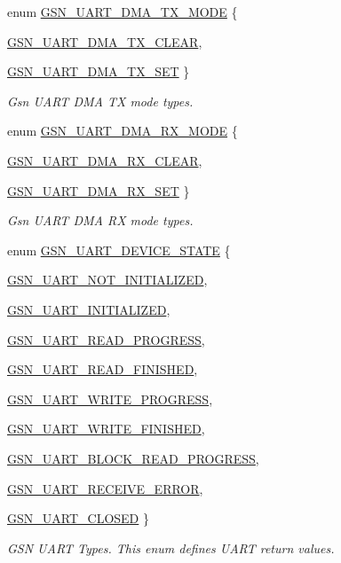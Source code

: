 \begin{DoxyCompactItemize}
enum \hyperlink{a00656_ga09347558a3ca84081b700f762369ff09}{GSN\_\-UART\_\-DMA\_\-TX\_\-MODE} \{ \par
\hyperlink{a00656_gga09347558a3ca84081b700f762369ff09ab713fb7412083d9608b9c7dcb47705f9}{GSN\_\-UART\_\-DMA\_\-TX\_\-CLEAR}, 
\par
\hyperlink{a00656_gga09347558a3ca84081b700f762369ff09a678a20a0d6e4f1a555e07f1291188153}{GSN\_\-UART\_\-DMA\_\-TX\_\-SET}
 \}
\begin{DoxyCompactList}\small\item\em Gsn UART DMA TX mode types. \end{DoxyCompactList}\item 
enum \hyperlink{a00656_gaef21b1191deb90943f343ad04ef5339b}{GSN\_\-UART\_\-DMA\_\-RX\_\-MODE} \{ \par
\hyperlink{a00656_ggaef21b1191deb90943f343ad04ef5339ba5440e9f8ca11a0d1fcd66fcbdac4a01d}{GSN\_\-UART\_\-DMA\_\-RX\_\-CLEAR}, 
\par
\hyperlink{a00656_ggaef21b1191deb90943f343ad04ef5339bad7cfcc300aded98ca2db71d3276cb442}{GSN\_\-UART\_\-DMA\_\-RX\_\-SET}
 \}
\begin{DoxyCompactList}\small\item\em Gsn UART DMA RX mode types. \end{DoxyCompactList}\item 
enum \hyperlink{a00656_ga42c5ecdf0c08902681813944c3b6afdc}{GSN\_\-UART\_\-DEVICE\_\-STATE} \{ \par
\hyperlink{a00656_gga42c5ecdf0c08902681813944c3b6afdca86763e1e0e68eff7d0d7daa2371bd4d8}{GSN\_\-UART\_\-NOT\_\-INITIALIZED}, 
\par
\hyperlink{a00656_gga42c5ecdf0c08902681813944c3b6afdca9e3fa475abd418f2edffe86d5528f4f1}{GSN\_\-UART\_\-INITIALIZED}, 
\par
\hyperlink{a00656_gga42c5ecdf0c08902681813944c3b6afdca090949a6a7da5bbd9bbb3b112715a3fa}{GSN\_\-UART\_\-READ\_\-PROGRESS}, 
\par
\hyperlink{a00656_gga42c5ecdf0c08902681813944c3b6afdca474ad9ad38710696ebc404a470bd992e}{GSN\_\-UART\_\-READ\_\-FINISHED}, 
\par
\hyperlink{a00656_gga42c5ecdf0c08902681813944c3b6afdcaf1b2680e1c8ae1a54ef960ec85995d94}{GSN\_\-UART\_\-WRITE\_\-PROGRESS}, 
\par
\hyperlink{a00656_gga42c5ecdf0c08902681813944c3b6afdcae05949f1fb3ada6a51123d06e9d693ed}{GSN\_\-UART\_\-WRITE\_\-FINISHED}, 
\par
\hyperlink{a00656_gga42c5ecdf0c08902681813944c3b6afdca7e2bf37128b2e3daba78e16f2da65c4b}{GSN\_\-UART\_\-BLOCK\_\-READ\_\-PROGRESS}, 
\par
\hyperlink{a00656_gga42c5ecdf0c08902681813944c3b6afdcae021460fb491bbba1b32996482fc12a2}{GSN\_\-UART\_\-RECEIVE\_\-ERROR}, 
\par
\hyperlink{a00656_gga42c5ecdf0c08902681813944c3b6afdca7a5fba23afa342bad30092e490b16635}{GSN\_\-UART\_\-CLOSED}
 \}
\begin{DoxyCompactList}\small\item\em GSN UART Types. This enum defines UART return values. \end{DoxyCompactList}\end{DoxyCompactItemize}
